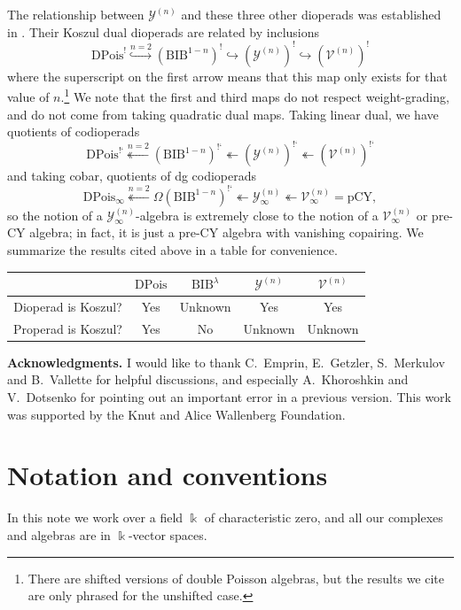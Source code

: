 \documentclass[11pt,a4paper]{amsart}
\newcommand{\kk}{\Bbbk}
\newcommand{\scrY}{\mathscr{Y}}
\newcommand{\scrV}{\mathscr{V}}
\newcommand{\antish}{\ensuremath{\mbox{!`}}}
\theoremstyle{definition}
\begin{document}
\noindent The relationship between $\scrY^{(n)}$ and these three other dioperads was established in \cite{leray2025precalabiyau,quesney2024balanced,emprin2025properadic}. Their Koszul dual dioperads are related by inclusions
\[ \mathrm{DPois}^! \overset{n=2}\hookrightarrow (\mathrm{BIB}^{1-n})^! \hookrightarrow (\scrY^{(n)})^! \hookrightarrow (\scrV^{(n)})^! \]
where the superscript on the first arrow means that this map only exists for that value of $n$.\footnote{There are shifted versions of double Poisson algebras, but the results we cite are only phrased for the unshifted case.} We note that the first and third maps do not respect weight-grading, and do not come from taking quadratic dual maps. Taking linear dual, we have quotients of codioperads
\[ \mathrm{DPois}^{\antish} \overset{n=2}\twoheadleftarrow (\mathrm{BIB}^{1-n})^{\antish} \twoheadleftarrow (\scrY^{(n)})^{\antish} \twoheadleftarrow (\scrV^{(n)})^{\antish} \]
and taking cobar, quotients of dg codioperads
\[ \mathrm{DPois}_\infty \overset{n=2}\twoheadleftarrow \Omega (\mathrm{BIB}^{1-n})^{\antish} \twoheadleftarrow \scrY^{(n)}_\infty \twoheadleftarrow \scrV^{(n)}_\infty = \mathrm{pCY}, \]
so the notion of a  $\scrY^{(n)}_\infty$-algebra is extremely close to the notion of a $\scrV^{(n)}_\infty$ or pre-CY algebra; in fact, it is just a pre-CY algebra with vanishing copairing. 
We summarize the results cited above in a table for convenience.
\begin{center}
    \begin{tabular}{|c||c|c|c|c|}
    \hline
                            & $\mathrm{DPois}$ & $\mathrm{BIB}^{\lambda}$  & $\scrY^{(n)}$ & $\scrV^{(n)}$ \\
    \hline
    Dioperad is Koszul?     & Yes              & Unknown                   & Yes           & Yes \\
    \hline
    Properad is Koszul?     & Yes              & No                    & Unknown           & Unknown \\
    \hline
    \end{tabular}
\end{center}

\noindent \textbf{Acknowledgments.} I would like to thank C.~Emprin, E.~Getzler, S.~Merkulov and B.~Vallette for helpful discussions, and especially A.~Khoroshkin and V.~Dotsenko for pointing out an important error in a previous version. This work was supported by the Knut and Alice Wallenberg Foundation.

\section*{Notation and conventions}
\noindent In this note we work over a field $\kk$ of characteristic zero, and all our complexes and algebras are in $\kk$-vector spaces.
\end{document}
